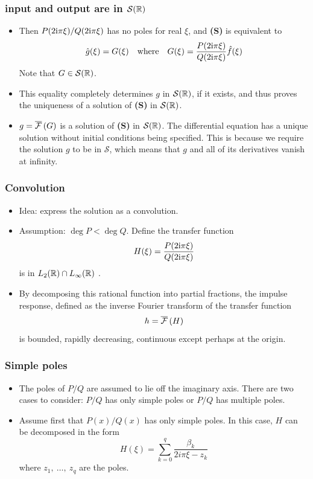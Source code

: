\begin{frame}
\frametitle{input and output are in $\mathcal{S}(\mathbb{R})$}
\begin{itemize}
\item Then $P(2 \mathrm{i}\pi\xi)/Q(2 \mathrm{i} \pi\xi)$ has no poles for real $\xi$, and  \alert{\textbf{(S)}} is equivalent to
$$
\hat{g}(\xi)= G(\xi) \quad \text{where} \quad G(\xi)= \frac{P(2 \mathrm{i} \pi\xi)}{Q(2\mathrm{i} \pi\xi)}\hat{f}(\xi)
$$
Note that \alert{$G \in \mathcal{S}(\mathbb{R})$}.
\item This equality completely determines $g$ in $\mathcal{S}(\mathbb{R})$, if it exists, and thus proves the uniqueness of a solution of \alert{\textbf{(S)}} in $\mathcal{S}(\mathbb{R})$.
\item $g=\overline{\mathcal{F}}\left( G \right)$ is a solution of \alert{\textbf{(S)}} in $\mathcal{S}(\mathbb{R})$.
{\tiny The differential equation has a unique solution without initial conditions being specified. This is because we require the solution $g$ to be in $\mathcal{S}$, which means that $g$ and all of its derivatives vanish at infinity.}
\end{itemize}
\end{frame}

\begin{frame}
\frametitle{Convolution}
\begin{itemize}
\item \alert{Idea:} express the solution as a convolution.
\item \alert{Assumption:} $\deg P<\deg Q$. Define the \alert{transfer function}
$$
H(\xi)=\frac{P(2 \mathrm{i} \pi\xi)}{Q(2 \mathrm{i} \pi\xi)}
$$
is in $L_2(\mathbb{R}) \cap L_\infty(\mathbb{R})$ .
\item By decomposing this rational function into partial fractions, the \alert{impulse response}, defined as the inverse Fourier transform of the \alert{transfer function}
$$
h=\overline{\mathcal{F}}\left( H \right)
$$
is bounded, rapidly decreasing, continuous except perhaps at the origin.
\end{itemize}
\end{frame}

\begin{frame}
\frametitle{Simple poles}
\begin{itemize}
\item The poles of $P/Q$ are assumed to lie off the imaginary axis. There are two cases to consider: $P/Q$ has only simple poles or $P/Q$ has multiple poles.
\item Assume first that $P(x)/Q(x)$ has only simple poles. In this case, $H$ can be decomposed in the form
$$
H(\xi)=\sum_{k=0}^{q}\frac{\beta_{k}}{2i\pi\xi-z_{k}}
$$
where $z_{1},\ \ldots,\ z_{q}$ are the poles.
\end{itemize}
\end{frame}

